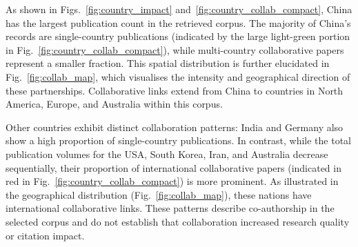 \documentclass[]{interact}
\theoremstyle{plain}%
\theoremstyle{definition}
\theoremstyle{remark}
\DeclareRobustCommand{\DIFadd}[1]{{\protect\color{DIFaddcolor}\uwave{#1}}}
\DeclareRobustCommand{\DIFdel}[1]{{\protect\color{DIFdelcolor}\sout{#1}}}
\def\DIFadd#1{#1}%
\def\DIFdel#1{}%
\begin{document}
As shown in Figs.~\ref{fig:country_impact} and~\ref{fig:country_collab_compact}, China \DIFdel{holds} \DIFdel{an} \DIFdel{absolute} \DIFdel{leading} \DIFdel{position}\DIFdel{,} \DIFdel{with} \DIFdel{its} \DIFdel{total} \DIFadd{has} \DIFadd{the} \DIFadd{largest} publication \DIFdel{volume} \DIFdel{far} \DIFdel{exceeding} \DIFdel{that} \DIFdel{of} \DIFdel{other} \DIFdel{nations} \DIFadd{count} \DIFadd{in} \DIFadd{the} \DIFadd{retrieved} \DIFadd{corpus}. The \DIFdel{vast} majority of China's \DIFdel{research} \DIFdel{is} \DIFdel{conducted} \DIFdel{independently} \DIFdel{within} \DIFdel{the} \DIFdel{country} \DIFadd{records} \DIFadd{are} \DIFadd{single-country} \DIFadd{publications} (indicated by the large light-green portion in Fig.~\ref{fig:country_collab_compact}), while multi-country collaborative papers represent a smaller fraction. This spatial distribution is further elucidated in Fig.~\ref{fig:collab_map}, which \DIFdel{visualizes} \DIFadd{visualises} the intensity and geographical direction of these partnerships. \DIFdel{Despite} \DIFdel{the} \DIFdel{high} \DIFdel{proportion} \DIFdel{of} \DIFdel{independent} \DIFdel{research}\DIFdel{,} \DIFadd{Collaborative} \DIFadd{links} \DIFadd{extend} \DIFadd{from} China \DIFdel{maintains} \DIFdel{a} \DIFdel{robust} \DIFdel{international} \DIFdel{network}\DIFdel{,} \DIFdel{with} \DIFdel{significant} \DIFdel{collaborative} \DIFdel{links} \DIFdel{extending} \DIFdel{primarily} to \DIFadd{countries} \DIFadd{in} North America, Europe, and Australia \DIFadd{within} \DIFadd{this} \DIFadd{corpus}.

Other countries exhibit distinct collaboration patterns: India and Germany also show a high proportion of \DIFdel{independent} \DIFdel{research} \DIFadd{single-country} \DIFadd{publications}. In contrast, while the total publication volumes for the USA, South Korea, Iran, and Australia decrease sequentially, their proportion of international collaborative papers (indicated in red in Fig.~\ref{fig:country_collab_compact}) is \DIFdel{significantly} more prominent. As illustrated in the geographical distribution (Fig.~\ref{fig:collab_map}), these nations \DIFdel{act} \DIFdel{as} \DIFdel{key} \DIFdel{nodes} \DIFadd{have} \DIFadd{international} \DIFadd{collaborative} \DIFadd{links}\DIFadd{.} \DIFadd{These} \DIFadd{patterns} \DIFadd{describe} \DIFadd{co-authorship} in the \DIFdel{global} \DIFdel{LULC} \DIFadd{selected} \DIFadd{corpus} \DIFadd{and} \DIFadd{do} \DIFadd{not} \DIFadd{establish} \DIFadd{that} \DIFadd{collaboration} \DIFadd{increased} research \DIFdel{network}\DIFdel{,} \DIFdel{facilitating} \DIFdel{transcontinental} \DIFdel{knowledge} \DIFdel{flow} \DIFadd{quality} \DIFadd{or} \DIFadd{citation} \DIFadd{impact}. \DIFdel{This} \DIFdel{reflects} \DIFdel{that} \DIFdel{while} \DIFdel{China} \DIFdel{leads} \DIFdel{in} \DIFdel{volume} \DIFdel{through} \DIFdel{primarily} \DIFdel{independent} \DIFdel{research}\DIFdel{,} \DIFdel{followed} \DIFdel{by} \DIFdel{India} \DIFdel{and} \DIFdel{Germany}\DIFdel{,} \DIFdel{other} \DIFdel{nations} \DIFdel{leverage} \DIFdel{international} \DIFdel{cooperation} \DIFdel{more} \DIFdel{extensively} \DIFdel{to} \DIFdel{enhance} \DIFdel{their} \DIFdel{scientific} \DIFdel{impact} \DIFdel{and} \DIFdel{resource} \DIFdel{sharing}\DIFdel{.}
\end{document}

